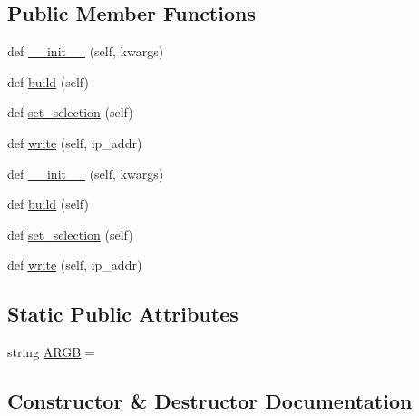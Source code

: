 \subsection*{Public Member Functions}
\begin{DoxyCompactItemize}
\item 
def \hyperlink{classTestingGUI_1_1SetValues_a2e5f962d54f1363a133feec2ca79a6f0}{\+\_\+\+\_\+init\+\_\+\+\_\+} (self, kwargs)
\item 
def \hyperlink{classTestingGUI_1_1SetValues_a27a7794b18e735441d0f90568b9b9070}{build} (self)
\item 
def \hyperlink{classTestingGUI_1_1SetValues_a1ac1751244272aadccd6d300ba58f70a}{set\+\_\+selection} (self)
\item 
def \hyperlink{classTestingGUI_1_1SetValues_abf5d39c7e49932e4d2fd545fecc97300}{write} (self, ip\+\_\+addr)
\item 
def \hyperlink{classTestingGUI_1_1SetValues_a2e5f962d54f1363a133feec2ca79a6f0}{\+\_\+\+\_\+init\+\_\+\+\_\+} (self, kwargs)
\item 
def \hyperlink{classTestingGUI_1_1SetValues_a27a7794b18e735441d0f90568b9b9070}{build} (self)
\item 
def \hyperlink{classTestingGUI_1_1SetValues_a1ac1751244272aadccd6d300ba58f70a}{set\+\_\+selection} (self)
\item 
def \hyperlink{classTestingGUI_1_1SetValues_abf5d39c7e49932e4d2fd545fecc97300}{write} (self, ip\+\_\+addr)
\end{DoxyCompactItemize}
\subsection*{Static Public Attributes}
\begin{DoxyCompactItemize}
\item 
string \hyperlink{classTestingGUI_1_1SetValues_a203442ab808fd942b5e86a3b8ec2fc15}{A\+R\+GB} = \textquotesingle{}\textquotesingle{}
\end{DoxyCompactItemize}


\subsection{Constructor \& Destructor Documentation}
